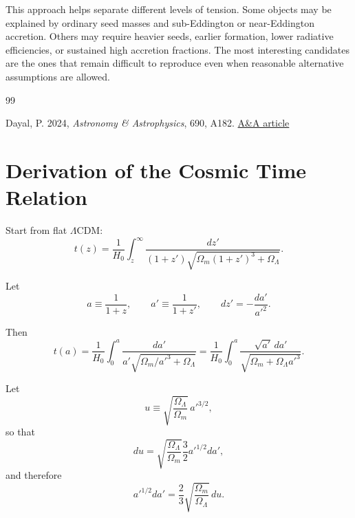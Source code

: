 \documentclass[letterpaper,12pt]{article}
\begin{document}
This approach helps separate different levels of tension. Some objects may be explained by ordinary seed masses and sub-Eddington or near-Eddington accretion. Others may require heavier seeds, earlier formation, lower radiative efficiencies, or sustained high accretion fractions. The most interesting candidates are the ones that remain difficult to reproduce even when reasonable alternative assumptions are allowed.


\begin{thebibliography}{99}

Dayal, P. 2024,
\textit{Astronomy \& Astrophysics}, 690, A182.
\href{https://www.aanda.org/articles/aa/full_html/2024/10/aa51481-24/aa51481-24.html}{A\&A article}

\end{thebibliography}

\appendix

\section{Derivation of the Cosmic Time Relation}

Start from flat $\Lambda$CDM:
\[
t(z)=\frac{1}{H_0}\int_z^\infty
\frac{dz'}{(1+z')\sqrt{\Omega_m(1+z')^3+\Omega_\Lambda}}.
\]

Let
\[
a\equiv \frac{1}{1+z},\qquad a'\equiv \frac{1}{1+z'},\qquad
dz'=-\frac{da'}{a'^2}.
\]

Then
\[
t(a)=\frac{1}{H_0}\int_0^a
\frac{da'}{a'\sqrt{\Omega_m/a'^3+\Omega_\Lambda}}
=
\frac{1}{H_0}\int_0^a
\frac{\sqrt{a'}\,da'}{\sqrt{\Omega_m+\Omega_\Lambda a'^3}}.
\]

Let
\[
u\equiv \sqrt{\frac{\Omega_\Lambda}{\Omega_m}}\,a'^{3/2},
\]
so that
\[
du=\sqrt{\frac{\Omega_\Lambda}{\Omega_m}}\frac{3}{2}a'^{1/2}da',
\]
and therefore
\[
a'^{1/2}da'=\frac{2}{3}\sqrt{\frac{\Omega_m}{\Omega_\Lambda}}\,du.
\]
\end{document}

